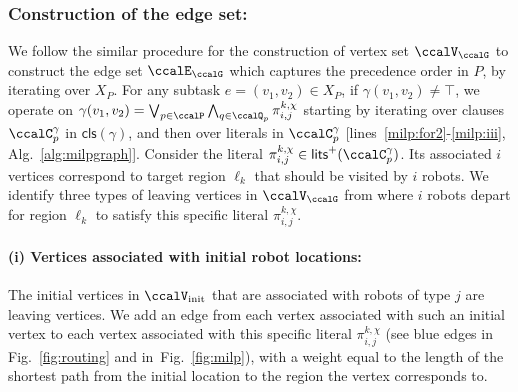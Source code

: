 \documentclass[Afour,sageh,times]{sagej}
\newcommand{\clause}[1]{\mathsf{cls}(#1)}
\renewcommand{\ap}[3]{\mathcal{\pi}_{{#1},{#2}}^{#3}}
\begin{document}
\subsubsection{Construction of  the edge set:}\label{sec:edge_set} We follow the similar procedure for the construction of vertex set $\ccalV_\ccalG$ to construct the edge set $\ccalE_\ccalG$ which captures the precedence order in ${P}$, by iterating over $X_P$. For any subtask $e = (v_1, v_2) \in X_{P}$, if $\gamma(v_1, v_2) \not=\top$, we operate on $\gamma(v_1, v_2) =  \bigvee_{p\in \ccalP} \bigwedge_{q \in \ccalQ_{p}} \ap{i}{j}{k,\chi}$ starting by iterating over clauses $\ccalC_p^{\gamma}$ in $\clause{\gamma}$, and then over literals in $\ccalC_p^\gamma$ [lines~\ref{milp:for2}-\ref{milp:iii}, Alg.~\ref{alg:milpgraph}]. Consider the literal $\ap{i}{j}{k,\chi} \in \mathsf{lits}^+(\ccalC_p^{\gamma})$. Its associated $i$ vertices correspond to target region $\ell_k$ that should be visited by $i$ robots. We identify three types of leaving vertices in $\ccalV_\ccalG$ from where $i$ robots depart for region $\ell_k$ to satisfy this specific literal $\ap{i}{j}{k,\chi}$.
\paragraph{(i) Vertices associated with initial robot locations:}\label{sec:a} The initial vertices in $\ccalV_{\text{init}}$ that are associated with  robots of type $j$ are leaving vertices. We add an edge from each vertex associated with such an initial vertex to each vertex associated with this specific literal $\ap{i}{j}{k,\chi}$ (see blue edges in Fig.~\ref{fig:routing} and in~Fig.~\ref{fig:milp}), with a weight equal to the length of the shortest path from the initial location to the region the vertex corresponds to.
\end{document}
